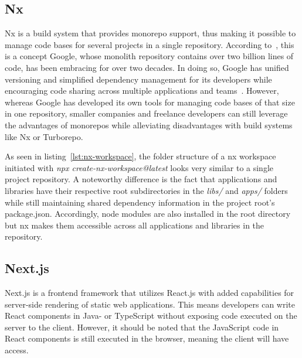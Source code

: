 \subsection{Nx}\label{subsec:nx}

Nx is a build system that provides monorepo support, thus making it possible to manage code bases for several projects in a single repository.
According to~\textcite[80]{potvin_why_2016}, this is a concept Google, whose monolith repository contains over two billion lines of code, has been embracing for over two decades.
In doing so, Google has unified versioning and simplified dependency management for its developers while encouraging code sharing across multiple applications and teams~\autocite[84]{potvin_why_2016}.
However, whereas Google has developed its own tools for managing code bases of that size in one repository, smaller companies and freelance developers can still leverage the advantages of monorepos while alleviating disadvantages with build systems like Nx or Turborepo.

As seen in listing~\ref{lst:nx-workspace}, the folder structure of a nx workspace initiated with \emph{npx create-nx-workspace@latest} looks very similar to a single project repository.
A noteworthy difference is the fact that applications and libraries have their respective root subdirectories in the \emph{libs/} and \emph{apps/} folders while still maintaining shared dependency information in the project root's package.json.
Accordingly, node modules are also installed in the root directory but nx makes them accessible across all applications and libraries in the repository.


\subsection{Next.js}\label{subsec:next.js}

Next.js is a frontend framework that utilizes React.js with added capabilities for server-side rendering of static web applications.
This means developers can write React components in Java- or TypeScript without exposing code executed on the server to the client.
However, it should be noted that the JavaScript code in React components is still executed in the browser, meaning the client will have access.


